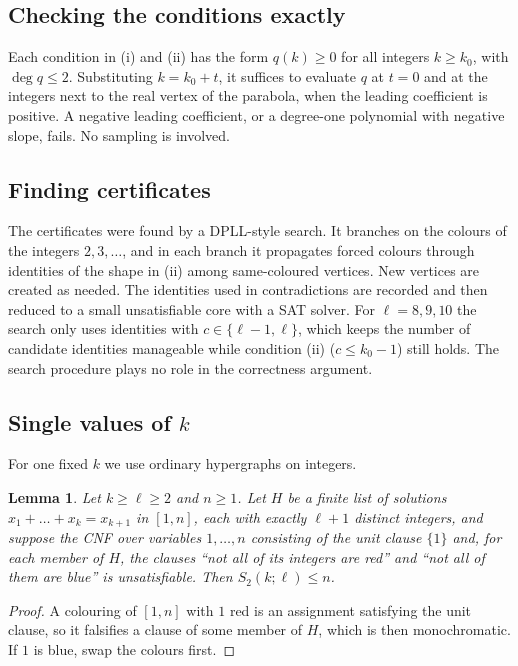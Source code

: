 \documentclass[11pt]{amsart}
\newtheorem{lemma}[theorem]{Lemma}
\theoremstyle{definition}
\newcommand{\Stwo}{S_2}
\begin{document}
\subsection*{Checking the conditions exactly} Each condition in (i) and (ii) has the form $q(k)\ge0$ for all integers $k\ge k_0$, with $\deg q\le2$. Substituting $k=k_0+t$, it suffices to evaluate $q$ at $t=0$ and at the integers next to the real vertex of the parabola, when the leading coefficient is positive. A negative leading coefficient, or a degree-one polynomial with negative slope, fails. No sampling is involved.

\subsection*{Finding certificates} The certificates were found by a DPLL-style search. It branches on the colours of the integers $2,3,\dots$, and in each branch it propagates forced colours through identities of the shape in (ii) among same-coloured vertices. New vertices are created as needed. The identities used in contradictions are recorded and then reduced to a small unsatisfiable core with a SAT solver. For $\ell=8,9,10$ the search only uses identities with $c\in\{\ell-1,\ell\}$, which keeps the number of candidate identities manageable while condition (ii) ($c\le k_0-1$) still holds. The search procedure plays no role in the correctness argument.

\subsection*{Single values of $k$} For one fixed $k$ we use ordinary hypergraphs on integers.

\begin{lemma}\label{lem:numeric}
Let $k\ge\ell\ge2$ and $n\ge1$. Let $H$ be a finite list of solutions $x_1+\dots+x_k=x_{k+1}$ in $[1,n]$, each with exactly $\ell+1$ distinct integers, and suppose the CNF over variables $1,\dots,n$ consisting of the unit clause $\{1\}$ and, for each member of $H$, the clauses ``not all of its integers are red'' and ``not all of them are blue'' is unsatisfiable. Then $\Stwo(k;\ell)\le n$.
\end{lemma}

\begin{proof}
A colouring of $[1,n]$ with $1$ red is an assignment satisfying the unit clause, so it falsifies a clause of some member of $H$, which is then monochromatic. If $1$ is blue, swap the colours first.
\end{proof}
\end{document}
